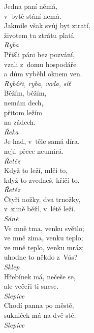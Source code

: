 \begin{multicols}{\value{columnsthindata}}
\noindent
Jedna paní němá,\\
v~bytě stání nemá.\\
Jakmile však svůj byt ztratí,\\
životem tu ztrátu platí.\\[1 mm]
{\sl Ryba}\\

\noindent
Přišli páni bez pozvání,\\
vzali z~domu hospodáře\\
a dům vyběhl oknem ven.\\[1 mm]
{\sl Rybáři, ryba, voda, síť}\\

\noindent
Běžím, běžím,\\
nemám dech,\\
přitom ležím\\
na zádech.\\[1 mm]
{\sl Řeka}\\

\noindent
Je had, v~těle samá díra,\\
nejí, přece neumírá.\\[1 mm]
{\sl Řetěz}\\

\noindent
Když to leží, mlčí to,\\
když to zvedneš, křičí to.\\[1 mm]
{\sl Řetěz}\\

\noindent
Čtyři nožky, dva trnožky,\\
v~zimě běží, v~létě leží.\\[1 mm]
{\sl Sáně}\\

\noindent
Ve mně tma, venku světlo;\\
ve mně zima, venku teplo;\\
ve mně teplo, venku mráz;\\
uhodne to někdo z~Vás?\\[1 mm]
{\sl Sklep}\\

\noindent
Hřebínek má, nečeše se,\\
ale večeři ti snese.\\[1 mm]
{\sl Slepice}\\

\noindent
Chodí panna po městě,\\
sukniček má na dvě stě.\\[1 mm]
{\sl Slepice}\\


\end{multicols}
